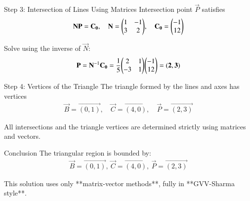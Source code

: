 \documentclass{beamer}
\begin{document}
\begin{frame}{Step 3: Intersection of Lines Using Matrices}
Intersection point $\vec{P}$ satisfies
\begin{align}
\mathbf{N} \mathbf{P} = \mathbf{C_0}, \quad
\mathbf{N} = \mathbf{\begin{pmatrix}1 & -1 \\ 3 & 2\end{pmatrix}}, \quad
\mathbf{C_0} = \mathbf{\begin{pmatrix}-1 \\ 12\end{pmatrix}}
\end{align}

Solve using the inverse of $\vec{N}$:
\begin{align}
\mathbf{P} = \mathbf{N}^{-1} \mathbf{C_0} = \frac{1}{5} \mathbf{\begin{pmatrix}2 & 1 \\ -3 & 1\end{pmatrix}} \mathbf{\begin{pmatrix}-1 \\ 12\end{pmatrix}} = \mathbf{(2,3)}
\end{align}
\end{frame}

\begin{frame}{Step 4: Vertices of the Triangle}
The triangle formed by the lines and axes has vertices
\begin{align}
\vec{B} = \vec{(0,1)}, \quad 
\vec{C} = \vec{(4,0)}, \quad 
\vec{P} = \vec{(2,3)}
\end{align}

All intersections and the triangle vertices are determined strictly using matrices and vectors.
\end{frame}

\begin{frame}{Conclusion}
The triangular region is bounded by:
\begin{align}
\boxed{\vec{B} = \vec{(0,1)},\ \vec{C} = \vec{(4,0)},\ \vec{P} = \vec{(2,3)}}
\end{align}

This solution uses only **matrix-vector methods**, fully in **GVV-Sharma style**.
\end{frame}
\end{document}
